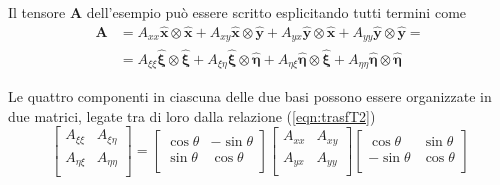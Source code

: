  Il tensore $\bm{A}$ dell'esempio può essere scritto esplicitando tutti termini come
 \begin{equation}
 \begin{aligned}
  \bm{A} & = A_{xx} \bm{\hat{x}} \otimes \bm{\hat{x}} + A_{xy} \bm{\hat{x}} \otimes \bm{\hat{y}} 
           + A_{yx} \bm{\hat{y}} \otimes \bm{\hat{x}} + A_{yy} \bm{\hat{y}} \otimes \bm{\hat{y}} = \\
         & = A_{\xi\xi} \bm{\hat{\xi}} \otimes \bm{\hat{\xi}} + A_{\xi\eta} \bm{\hat{\xi}} \otimes \bm{\hat{\eta}} 
           + A_{\eta\xi} \bm{\hat{\eta}} \otimes \bm{\hat{\xi}} + A_{\eta\eta} \bm{\hat{\eta}} \otimes \bm{\hat{\eta}}
 \end{aligned}
 \end{equation}
 
 Le quattro componenti in ciascuna delle due basi possono essere organizzate in due matrici, legate tra di loro
 dalla relazione (\ref{eqn:trasfT2})
 \begin{equation}
   \begin{bmatrix}
    A_{\xi \xi} & A_{\xi \eta} \\
    A_{\eta\xi} & A_{\eta\eta} \\
   \end{bmatrix} = 
   \begin{bmatrix} 
    \cos{\theta} &-\sin{\theta} \\
    \sin{\theta} & \cos{\theta} \\
   \end{bmatrix}
   \begin{bmatrix}
    A_{xx} & A_{xy} \\
    A_{yx} & A_{yy} \\
   \end{bmatrix}
   \begin{bmatrix} 
    \cos{\theta} & \sin{\theta} \\
   -\sin{\theta} & \cos{\theta} \\
   \end{bmatrix}
 \end{equation}
 
